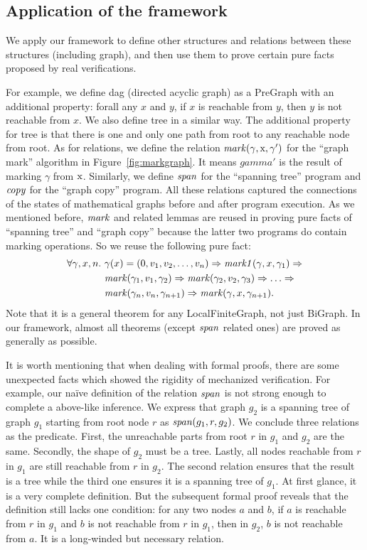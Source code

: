 \subsection{Application of the framework}

We apply our framework to define other structures and relations
between these structures (including graph), and then use them to prove
certain pure facts proposed by real verifications.

For example, we define dag (directed acyclic graph) as a PreGraph with
an additional property: forall any $x$ and $y$, if $x$ is reachable
from $y$, then $y$ is not reachable from $x$. We also define tree in a
similar way. The additional property for tree is that there is one and
only one path from root to any reachable node from root. As for
relations, we define the relation $\mathit{mark}(\gamma, \text{x}, \gamma')$
for the ``graph mark'' algorithm in Figure~\ref{fig:markgraph}. It
means $gamma'$ is the result of marking $\gamma$ from $\text{x}$. Similarly, we define $\mathit{span}$ for the ``spanning tree'' program
and $\mathit{copy}$ for the ``graph copy'' program. All these relations
captured the connections of the states of mathematical graphs before
and after program execution. As we mentioned before, $\mathit{mark}$ and
related lemmas are reused in proving pure facts of ``spanning tree''
and ``graph copy'' because the latter two programs do contain marking
operations. So we reuse the following pure fact:
\begin{equation*}
\begin{split}
\forall \gamma, x, n.~&\gamma(x)=(0, v_1, v_2,\dots,v_n) => \mathit{mark1}(\gamma, x, \gamma_1) =>\\
        & \mathit{mark}(\gamma_1,v_1,\gamma_2) => \mathit{mark}(\gamma_2,v_2,\gamma_3) => \dots =>\\
        & \mathit{mark}(\gamma_n,v_n,\gamma_{n+1}) => \mathit{mark}(\gamma,x,\gamma_{n+1}).
\end{split}
\end{equation*}
Note that it is a general theorem for any LocalFiniteGraph, not just
BiGraph. In our framework, almost all theorems (except $\mathit{span}$
related ones) are proved as generally as possible.

It is worth mentioning that when dealing with formal proofs, there are
some unexpected facts which showed the rigidity of mechanized
verification. For example, our na\"ive definition of the relation
$\mathit{span}$ is not strong enough to complete a above-like inference. We
express that graph $g_2$ is a spanning tree of graph $g_1$ starting
from root node $r$ as $\mathit{span}(g_1, r, g_2)$. We conclude three
relations as the predicate. First, the unreachable parts from root $r$
in $g_1$ and $g_2$ are the same. Secondly, the shape of $g_2$ must be
a tree. Lastly, all nodes reachable from $r$ in $g_1$ are still
reachable from $r$ in $g_2$. The second relation ensures that the
result is a tree while the third one ensures it is a spanning tree of
$g_1$. At first glance, it is a very complete definition. But the
subsequent formal proof reveals that the definition still lacks one
condition: for any two nodes $a$ and $b$, if $a$ is reachable from $r$
in $g_1$ and $b$ is not reachable from $r$ in $g_1$, then in $g_2$,
$b$ is not reachable from $a$. It is a long-winded but necessary
relation.
